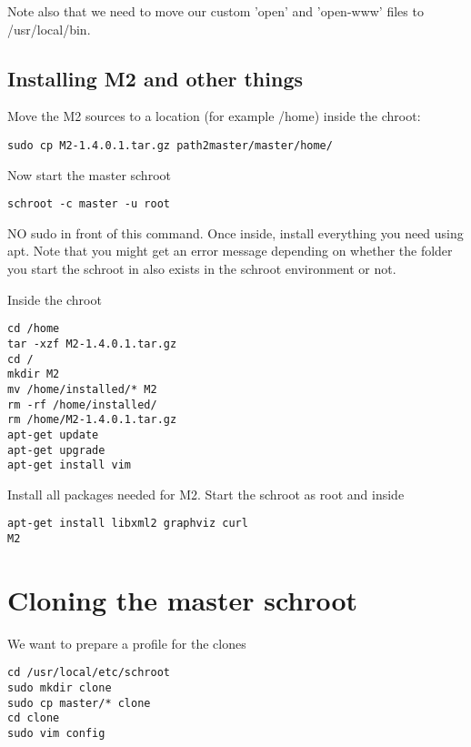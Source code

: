\documentclass[a4paper]{book}
\begin{document}
Note also that we need to move our custom 'open' and 'open-www' files to /usr/local/bin.

\subsection{Installing M2 and other things}

Move the M2 sources to a location (for example /home) inside the chroot:

\begin{verbatim}
sudo cp M2-1.4.0.1.tar.gz path2master/master/home/
\end{verbatim}

Now start the master schroot

\begin{verbatim}
schroot -c master -u root
\end{verbatim}

NO sudo in front of this command. Once inside, install everything you need
using apt.  Note that you might get an error message depending on whether the
folder you start the schroot in also exists in the schroot environment or not.

Inside the chroot

\begin{verbatim}
cd /home
tar -xzf M2-1.4.0.1.tar.gz
cd /
mkdir M2
mv /home/installed/* M2
rm -rf /home/installed/
rm /home/M2-1.4.0.1.tar.gz
apt-get update
apt-get upgrade
apt-get install vim
\end{verbatim}

Install all packages needed for M2. Start the schroot as root and inside

\begin{verbatim}
apt-get install libxml2 graphviz curl
M2
\end{verbatim}

\section{Cloning the master schroot}

We want to prepare a profile for the clones

\begin{verbatim}
cd /usr/local/etc/schroot
sudo mkdir clone
sudo cp master/* clone
cd clone
sudo vim config
\end{verbatim}
\end{document}
